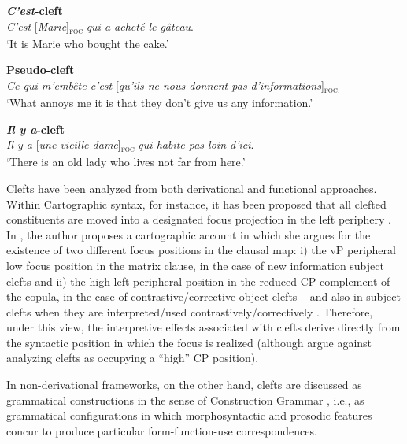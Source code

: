\ea \label{ex:2:11} \textbf{\textit{C'est}-cleft}\\
\textit{C'est} {[\textit{Marie}]\textsubscript{\textsc{foc}}} \normalsize \textit{qui a acheté le gâteau}.\\
`It is Marie who bought the cake.'

\z

\ea \label{ex:2:12} \textbf{Pseudo-cleft}\\
\textit{Ce qui m'embête c'est} {[\textit{qu'ils ne nous donnent pas d'informations}]\textsubscript{\textsc{foc.}}}\normalsize\\
`What annoys me it is that they don't give us any information.'

\z

\ea \label{ex:2:13}\textbf{\textit{Il y a}-cleft}\\
\textit{Il y a} {[\textit{une vieille dame}]\textsubscript{\textsc{foc}}} \normalsize \textit{qui habite pas loin d'ici}.\\
`There is an old lady who lives not far from here.'

\z

Clefts have been analyzed from both derivational and functional approaches. Within Cartographic syntax, for instance, it has been proposed that all clefted constituents are moved into a designated focus projection in the left periphery \parencite{kiss1998identificational, kiss1999english}. In \textcite{belletti2008answering, belletti2008cp, belletti2012revisiting}, the author proposes a cartographic account in which she argues for the existence of two different focus positions in the clausal map: i) the vP peripheral low focus position in the matrix clause, in the case of new information subject clefts and ii) the high left peripheral position in the reduced CP complement of the copula, in the case of contrastive/corrective object clefts – and also in subject clefts when they are interpreted/used contrastively/correctively \parencite[96]{belletti2012revisiting}. Therefore, under this view, the interpretive effects associated with clefts derive directly from the syntactic position in which the focus is realized (although \cite{haegeman2014architecture} argue against analyzing clefts as occupying a ``high” CP position).

In non-derivational frameworks, on the other hand, clefts are discussed as grammatical constructions in the sense of Construction Grammar \parencite{fillmore1988mechanisms}, i.e., as grammatical  configurations  in  which  morphosyntactic  and prosodic features concur to produce particular form-function-use correspondences.

